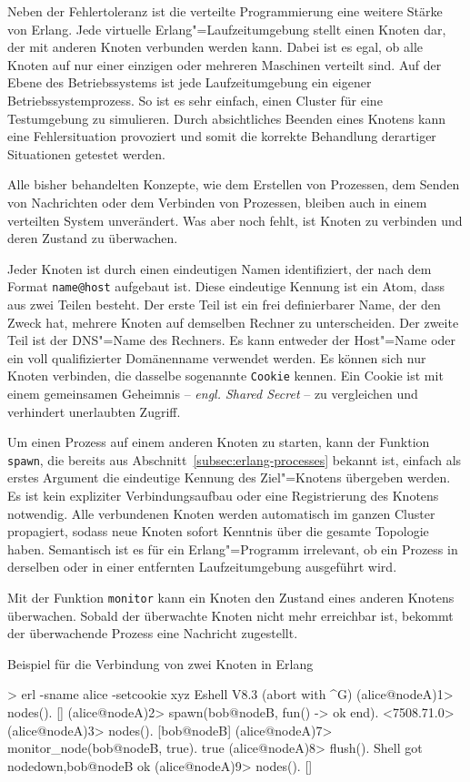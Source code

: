 Neben der Fehlertoleranz ist die verteilte Programmierung eine weitere Stärke von Erlang. Jede virtuelle Erlang"=Laufzeitumgebung stellt einen Knoten dar, der mit anderen Knoten verbunden werden kann. Dabei ist es egal, ob alle Knoten auf nur einer einzigen oder mehreren Maschinen verteilt sind. Auf der Ebene des Betriebssystems ist jede Laufzeitumgebung ein eigener Betriebssystemprozess. So ist es sehr einfach, einen Cluster für eine Testumgebung zu simulieren. Durch absichtliches Beenden eines Knotens kann eine Fehlersituation provoziert und somit die korrekte Behandlung derartiger Situationen getestet werden.

Alle bisher behandelten Konzepte, wie dem Erstellen von Prozessen, dem Senden von Nachrichten oder dem Verbinden von Prozessen, bleiben auch in einem verteilten System unverändert. Was aber noch fehlt, ist Knoten zu verbinden und deren Zustand zu überwachen.

Jeder Knoten ist durch einen eindeutigen Namen identifiziert, der nach dem Format \lstinline{name@host} aufgebaut ist. Diese eindeutige Kennung ist ein Atom, dass aus zwei Teilen besteht. Der erste Teil ist ein frei definierbarer Name, der den Zweck hat, mehrere Knoten auf demselben Rechner zu unterscheiden. Der zweite Teil ist der DNS"=Name des Rechners. Es kann entweder der Host"=Name oder ein voll qualifizierter Domänenname verwendet werden. Es können sich nur Knoten verbinden, die dasselbe sogenannte \lstinline{Cookie} kennen. Ein Cookie ist mit einem gemeinsamen Geheimnis -- \textit{engl. Shared Secret} -- zu vergleichen und verhindert unerlaubten Zugriff.

Um einen Prozess auf einem anderen Knoten zu starten, kann der Funktion \lstinline{spawn}, die bereits aus Abschnitt~\ref{subsec:erlang-processes} bekannt ist, einfach als erstes Argument die eindeutige Kennung des Ziel"=Knotens übergeben werden. Es ist kein expliziter Verbindungsaufbau oder eine Registrierung des Knotens notwendig. Alle verbundenen Knoten werden automatisch im ganzen Cluster propagiert, sodass neue Knoten sofort Kenntnis über die gesamte Topologie haben. Semantisch ist es für ein Erlang"=Programm irrelevant, ob ein Prozess in derselben oder in einer entfernten Laufzeitumgebung ausgeführt wird.

Mit der Funktion \lstinline{monitor} kann ein Knoten den Zustand eines anderen Knotens überwachen. Sobald der überwachte Knoten nicht mehr erreichbar ist, bekommt der überwachende Prozess eine Nachricht zugestellt.

\begin{program}[!hbt]
\caption{Beispiel für die Verbindung von zwei Knoten in Erlang}
\label{prog:erlang-distributed}
\begin{ErlangCode}
> erl -sname alice -setcookie xyz
Eshell V8.3  (abort with ^G)
(alice@nodeA)1> nodes().
[]
(alice@nodeA)2> spawn(bob@nodeB, fun() -> ok end).
<7508.71.0>
(alice@nodeA)3> nodes().
[bob@nodeB]
(alice@nodeA)7> monitor_node(bob@nodeB, true).
true
(alice@nodeA)8> flush(). %
Shell got {nodedown,bob@nodeB}
ok
(alice@nodeA)9> nodes().
[]
\end{ErlangCode}
\end{program}

